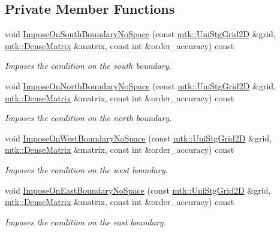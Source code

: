 \subsection*{Private Member Functions}
\begin{DoxyCompactItemize}
\item 
void \hyperlink{classmtk_1_1BCDescriptor2D_a0188a64f242ae6015385a4597934fcda}{Impose\+On\+South\+Boundary\+No\+Space} (const \hyperlink{classmtk_1_1UniStgGrid2D}{mtk\+::\+Uni\+Stg\+Grid2\+D} \&grid, \hyperlink{classmtk_1_1DenseMatrix}{mtk\+::\+Dense\+Matrix} \&matrix, const int \&order\+\_\+accuracy) const 
\begin{DoxyCompactList}\small\item\em Imposes the condition on the south boundary. \end{DoxyCompactList}\item 
void \hyperlink{classmtk_1_1BCDescriptor2D_a5e7d4b9deba6c07170e983eb1c0e9776}{Impose\+On\+North\+Boundary\+No\+Space} (const \hyperlink{classmtk_1_1UniStgGrid2D}{mtk\+::\+Uni\+Stg\+Grid2\+D} \&grid, \hyperlink{classmtk_1_1DenseMatrix}{mtk\+::\+Dense\+Matrix} \&matrix, const int \&order\+\_\+accuracy) const 
\begin{DoxyCompactList}\small\item\em Imposes the condition on the north boundary. \end{DoxyCompactList}\item 
void \hyperlink{classmtk_1_1BCDescriptor2D_a0b153abdcb78c54197858148c9632517}{Impose\+On\+West\+Boundary\+No\+Space} (const \hyperlink{classmtk_1_1UniStgGrid2D}{mtk\+::\+Uni\+Stg\+Grid2\+D} \&grid, \hyperlink{classmtk_1_1DenseMatrix}{mtk\+::\+Dense\+Matrix} \&matrix, const int \&order\+\_\+accuracy) const 
\begin{DoxyCompactList}\small\item\em Imposes the condition on the west boundary. \end{DoxyCompactList}\item 
void \hyperlink{classmtk_1_1BCDescriptor2D_a65f58f43f3fdc793cce7293780b70b80}{Impose\+On\+East\+Boundary\+No\+Space} (const \hyperlink{classmtk_1_1UniStgGrid2D}{mtk\+::\+Uni\+Stg\+Grid2\+D} \&grid, \hyperlink{classmtk_1_1DenseMatrix}{mtk\+::\+Dense\+Matrix} \&matrix, const int \&order\+\_\+accuracy) const 
\begin{DoxyCompactList}\small\item\em Imposes the condition on the east boundary. \end{DoxyCompactList}\item 

\end{DoxyCompactItemize}
